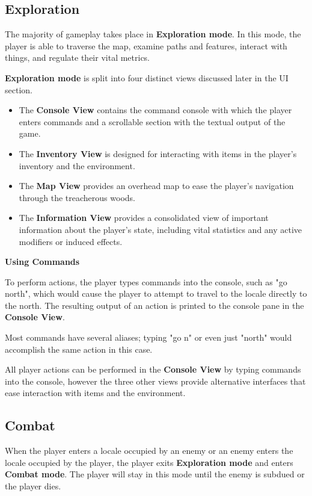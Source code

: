 \documentclass[11pt]{article}
\begin{document}
	\subsection{Exploration}
	
	The majority of gameplay takes place in \textbf{Exploration mode}. In this mode, the player is able to traverse the map, examine paths and features, interact with things, and regulate their vital metrics.
	
	\textbf{Exploration mode} is split into four distinct views discussed later in the UI section.
	
	\begin{itemize}
		\item The \textbf{Console View} contains the command console with which the player enters commands and a scrollable section with the textual output of the game.
		\item The \textbf{Inventory View} is designed for interacting with items in the player's inventory and the environment.
		\item The \textbf{Map View} provides an overhead map to ease the player's navigation through the treacherous woods.
		\item The \textbf{Information View} provides a consolidated view of important information about the player's state, including vital statistics and any active modifiers or induced effects.
	\end{itemize}

	\textbf{Using Commands}
	
	To perform actions, the player types commands into the console, such as "go north", which would cause the player to attempt to travel to the locale directly to the north. The resulting output of an action is printed to the console pane in the \textbf{Console View}.
	
	Most commands have several aliases; typing "go n" or even just "north" would accomplish the same action in this case.
	
	All player actions can be performed in the \textbf{Console View} by typing commands into the console, however the three other views provide alternative interfaces that ease interaction with items and the environment.
	
	\subsection{Combat}
	
	When the player enters a locale occupied by an enemy or an enemy enters the locale occupied by the player, the player exits \textbf{Exploration mode} and enters \textbf{Combat mode}. The player will stay in this mode until the enemy is subdued or the player dies.
	
\end{document}
